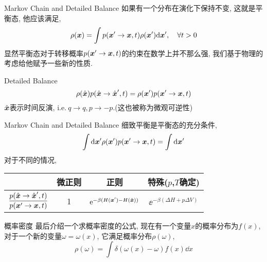     \begin{frame}{Markov Chain and Detailed Balance}
        如果有一个分布在演化下保持不变, 这就是平衡态, 他应该满足,
        \begin{equation}
            \rho(\vb*x) = \int p(\vb*x'\to\vb*x, t)\rho(\vb*x')\dd\vb*x',\quad\forall t>0
        \end{equation}
        显然平衡态对于转移概率$p(\vb*x'\to\vb*x,t)$的约束在数学上并不那么强, 我们基于物理的考虑给他赋予一些新的性质.
        \begin{block}{Detailed Balance}
            \begin{equation}
                \rho(\hat{\vb*x})p(\hat{\vb*x}\to\hat{\vb*x}',t) = \rho(\vb*x')p(\vb*x'\to\vb*x,t)
            \end{equation}
            $\hat{\vb*x}$表示时间反演, i.e.$\ q\to q, p\to -p$.(这也被称为微观可逆性)
        \end{block}
    \end{frame}
    \begin{frame}{Markov Chain and Detailed Balance}
        细致平衡是平衡态的充分条件,
        \begin{equation}
            \int\dd\vb*x'\rho(\vb*x')p(\vb*x'\to\vb*x,t) = \int\dd\vb*x'
        \end{equation}
        对于不同的情况,
        \begin{table}[H]
            \centering
            \begin{tabular}{cccc}
                \toprule
                &微正则 & 正则 & 特殊($p$,$T$确定)\\
                \midrule
                $\dfrac{p(\hat{\vb*x}\to\hat{\vb*x}',t)}{p(\vb*x'\to\vb*x,t)}$ & 1 &$\mathrm{e}^{-\beta(H(\vb*x') - H(\hat{\vb*x}))}$ & $\ee^{-\beta(\Delta H + p \Delta V)}$\\
                \bottomrule
            \end{tabular}
        \end{table}
    \end{frame}
    \begin{frame}{概率密度}
        最后介绍一个求概率密度的公式, 现在有一个变量$x$的概率分布为$f(x)$, 对于一个新的变量$\omega = \omega(x)$, 它满足概率分布$\rho(\omega)$, 
        \begin{equation}
            \rho(\omega) = \int \delta(\omega(x) - \omega) f(x)\dd x
        \end{equation}
    \end{frame}
